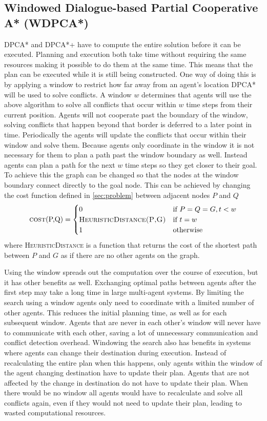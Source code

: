 \subsection{Windowed Dialogue-based Partial Cooperative A* (WDPCA*)}
DPCA* and DPCA*+ have to compute the entire solution before it can be executed.
Planning and execution both take time
without requiring the same resources making it possible to do them at the
same time. This means that the plan can be executed while it is still being
constructed. One way of doing this is by applying a window to restrict how far
away from an agent's location DPCA* will be used to solve conflicts. A
window $w$ determines that agents will use the above algorithm to solve all
conflicts that occur within $w$ time steps from their current position. Agents
will not cooperate past the boundary of the window, solving conflicts that
happen beyond that border is deferred to a later point in time. Periodically
the agents will update the conflicts that occur within their window and solve 
them.
Because agents only coordinate in the window it is not necessary for them to
plan a path past the window boundary as well. Instead agents can plan a path
for the next $w$ time steps so they get closer to their goal. To achieve this
the graph can be changed so that the nodes at the window boundary connect
directly to the goal node. This can be achieved by changing the cost function
defined in \autoref{sec:problem} between adjacent nodes $P$ and $Q$
\cite{silver2005}
\[
\text{\textsc{cost}(P,Q)} =
\begin{cases}
    0 & \text{if } P = Q = G, t < w \\
    \textsc{HeuristicDistance(P,G)} & \text{if } t = w \\
    1 & \text{otherwise}
\end{cases}
\]
where \textsc{HeuristicDistance} is a function that returns the cost of the
shortest path between $P$ and $G$ as if there are no other agents on the graph.

Using the window spreads out the computation over the course of execution, but
it has other benefits as well. Exchanging optimal paths between agents after
the first step may take a long time in large multi-agent systems.
By limiting the search using a window agents only need to coordinate with a
limited number of other agents. This reduces
the initial planning time, as well as for each subsequent window. Agents that
are never in each other's window will never have to communicate with each other,
saving a lot of unnecessary communication and conflict detection overhead.
Windowing the search also has benefits in systems where agents can change their
destination during execution. Instead of recalculating the entire plan when
this happens, only agents within the window of the agent changing destination
have to update their plan. Agents that are not affected by the change in
destination do not have to update their plan. When there would be no window all
agents would have to recalculate and solve all conflicts again, even if they
would not need to update their plan, leading to wasted computational resources.

